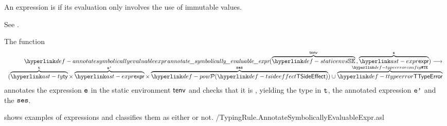 \begin{mathpar}
\end{mathpar}

\begin{mathpar}
\end{mathpar}

\begin{mathpar}
\end{mathpar}

An expression is \symbolicallyevaluable{} if its evaluation only involves
the use of immutable values.

See .

\hypertarget{def-annotatesymbolicallyevaluableexpr}{}
The function
\[
\begin{array}{r}
  \annotatesymbolicallyevaluableexpr(\overname{\staticenvs}{\tenv} \aslsep \overname{\expr}{\ve}) \aslto \\
  (\overname{\ty}{\vt}\times\overname{\expr}{\vep}\times\overname{\TSideEffectSet}{\vses}) \cup \overname{\TTypeError}{\TypeErrorConfig}
\end{array}
\]
annotates the expression $\ve$ in the static environment $\tenv$ and checks that it is \symbolicallyevaluable,
yielding the type in $\vt$, the annotated expression $\vep$ and the \sideeffectsetterm{} $\vses$.
\ProseOtherwiseTypeError

 shows examples of
expressions and classifies them as either \symbolicallyevaluable{} or not.
{\typingtests/TypingRule.AnnotateSymbolicallyEvaluableExpr.asl}

